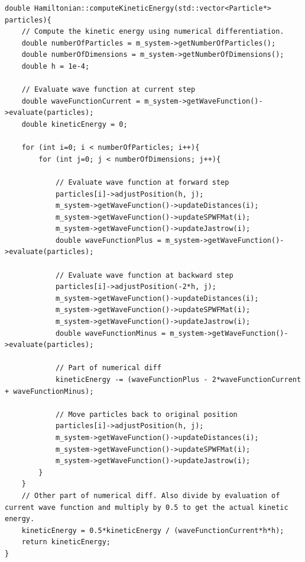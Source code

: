 \documentclass[../main.tex]{subfiles}
\begin{document}
\begin{lstlisting}[caption={Function for calculating the kinetic energy by numerical differentiation. The function is general for all the sub classes of the Hamiltonian class, and is therefore implemented once, in the super class "hamiltonian.cpp".}]
double Hamiltonian::computeKineticEnergy(std::vector<Particle*> particles){
    // Compute the kinetic energy using numerical differentiation.
    double numberOfParticles = m_system->getNumberOfParticles();
    double numberOfDimensions = m_system->getNumberOfDimensions();
    double h = 1e-4;

    // Evaluate wave function at current step
    double waveFunctionCurrent = m_system->getWaveFunction()->evaluate(particles);
    double kineticEnergy = 0;

    for (int i=0; i < numberOfParticles; i++){
        for (int j=0; j < numberOfDimensions; j++){
        
            // Evaluate wave function at forward step
            particles[i]->adjustPosition(h, j);
            m_system->getWaveFunction()->updateDistances(i);
            m_system->getWaveFunction()->updateSPWFMat(i);
            m_system->getWaveFunction()->updateJastrow(i);
            double waveFunctionPlus = m_system->getWaveFunction()->evaluate(particles);

            // Evaluate wave function at backward step
            particles[i]->adjustPosition(-2*h, j);
            m_system->getWaveFunction()->updateDistances(i);
            m_system->getWaveFunction()->updateSPWFMat(i);
            m_system->getWaveFunction()->updateJastrow(i);
            double waveFunctionMinus = m_system->getWaveFunction()->evaluate(particles);

            // Part of numerical diff
            kineticEnergy -= (waveFunctionPlus - 2*waveFunctionCurrent + waveFunctionMinus);

            // Move particles back to original position
            particles[i]->adjustPosition(h, j);
            m_system->getWaveFunction()->updateDistances(i);
            m_system->getWaveFunction()->updateSPWFMat(i);
            m_system->getWaveFunction()->updateJastrow(i);
        }
    }
    // Other part of numerical diff. Also divide by evaluation of current wave function and multiply by 0.5 to get the actual kinetic energy.
    kineticEnergy = 0.5*kineticEnergy / (waveFunctionCurrent*h*h);
    return kineticEnergy;
}
\end{lstlisting}
\end{document}
